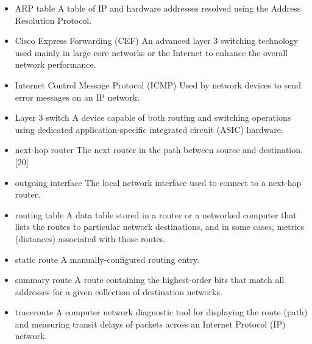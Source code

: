 \documentclass[../EngineeringJournal_CDavis.tex]{subfiles}
\begin{document}
\newpage




\hspace{0.2cm}
\begin{tcolorbox}[width=6.3in]
\scriptsize 
\begin{itemize}
  \item{ARP table}
    \subitem{}A table of IP and hardware addresses resolved using the Address Resolution Protocol.
  \item{Cisco Express Forwarding (CEF)}
    \subitem{}An advanced layer 3 switching technology used mainly in large core
    networks or the Internet to enhance the overall network performance.
  \item{Internet Control Message Protocol (ICMP)}
    \subitem{}Used by network devices to send error messages on an IP network.
  \item{Layer 3 switch}
    \subitem{}A device capable of both routing and switching operations using dedicated application-specific integrated circuit (ASIC) hardware.
  \item{next-hop router}
    \subitem{}The next router in the path between source and destination.[20]
  \item{outgoing interface}
    \subitem{}The local network interface used to connect to a next-hop router.
  \item{routing table}
    \subitem{}A data table stored in a router or a networked computer that lists the routes to particular network destinations, and in some cases, metrics (distances) associated with those routes.
  \item{static route}
    \subitem{}A manually-configured routing entry.
  \item{summary route}
    \subitem{}A route containing the highest-order bits that match all addresses for a given collection of destination networks.
  \item{traceroute}
    \subitem{}A computer network diagnostic tool for displaying the route (path) and measuring transit delays of packets across an Internet Protocol (IP) network.
\end{itemize}
\end{tcolorbox}
\hspace{0.2cm}
\normalsize  


\end{document}
